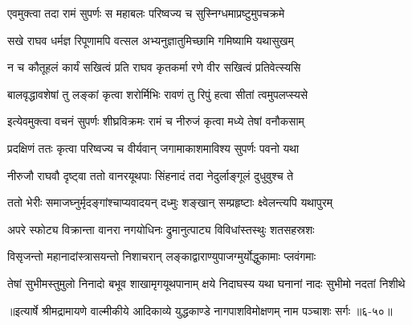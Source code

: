 \twolineshloka
{एवमुक्त्वा तदा रामं सुपर्णः स महाबलः}
{परिष्वज्य च सुस्निग्धमाप्रष्टुमुपचक्रमे} %

\twolineshloka
{सखे राघव धर्मज्ञ रिपूणामपि वत्सल}
{अभ्यनुज्ञातुमिच्छामि गमिष्यामि यथासुखम्} %

\twolineshloka
{न च कौतूहलं कार्यं सखित्वं प्रति राघव}
{कृतकर्मा रणे वीर सखित्वं प्रतिवेत्स्यसि} %

\twolineshloka
{बालवृद्धावशेषां तु लङ्कां कृत्वा शरोर्मिभिः}
{रावणं तु रिपुं हत्वा सीतां त्वमुपलप्स्यसे} %

\twolineshloka
{इत्येवमुक्त्वा वचनं सुपर्णः शीघ्रविक्रमः}
{रामं च नीरुजं कृत्वा मध्ये तेषां वनौकसाम्} %

\twolineshloka
{प्रदक्षिणं ततः कृत्वा परिष्वज्य च वीर्यवान्}
{जगामाकाशमाविश्य सुपर्णः पवनो यथा} %

\twolineshloka
{नीरुजौ राघवौ दृष्ट्वा ततो वानरयूथपाः}
{सिंहनादं तदा नेदुर्लाङ्गूलं दुधुवुश्च ते} %

\twolineshloka
{ततो भेरीः समाजघ्नुर्मृदङ्गांश्चाप्यवादयन्}
{दध्मुः शङ्खान् सम्प्रहृष्टाः क्ष्वेलन्त्यपि यथापुरम्} %

\twolineshloka
{अपरे स्फोट्य विक्रान्ता वानरा नगयोधिनः}
{द्रुमानुत्पाट्य विविधांस्तस्थुः शतसहस्रशः} %

\twolineshloka
{विसृजन्तो महानादांस्त्रासयन्तो निशाचरान्}
{लङ्काद्वाराण्युपाजग्मुर्योद्धुकामाः प्लवंगमाः} %

\twolineshloka
{तेषां सुभीमस्तुमुलो निनादो बभूव शाखामृगयूथपानाम्}
{क्षये निदाघस्य यथा घनानां नादः सुभीमो नदतां निशीथे} %


॥इत्यार्षे श्रीमद्रामायणे वाल्मीकीये आदिकाव्ये युद्धकाण्डे नागपाशविमोक्षणम् नाम पञ्चाशः सर्गः ॥६-५०॥

